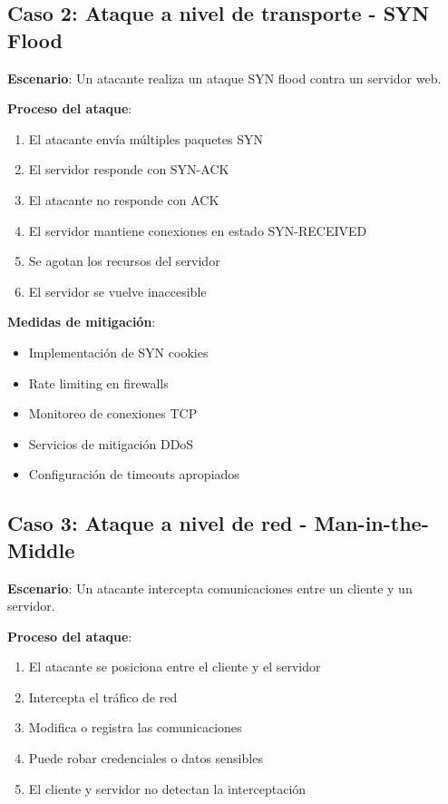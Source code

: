 \subsection{Caso 2: Ataque a nivel de transporte - SYN Flood}

\textbf{Escenario}: Un atacante realiza un ataque SYN flood contra un servidor web.

\textbf{Proceso del ataque}:
\begin{enumerate}
    \item El atacante envía múltiples paquetes SYN
    \item El servidor responde con SYN-ACK
    \item El atacante no responde con ACK
    \item El servidor mantiene conexiones en estado SYN-RECEIVED
    \item Se agotan los recursos del servidor
    \item El servidor se vuelve inaccesible
\end{enumerate}

\textbf{Medidas de mitigación}:
\begin{itemize}
    \item Implementación de SYN cookies
    \item Rate limiting en firewalls
    \item Monitoreo de conexiones TCP
    \item Servicios de mitigación DDoS
    \item Configuración de timeouts apropiados
\end{itemize}

\subsection{Caso 3: Ataque a nivel de red - Man-in-the-Middle}

\textbf{Escenario}: Un atacante intercepta comunicaciones entre un cliente y un servidor.

\textbf{Proceso del ataque}:
\begin{enumerate}
    \item El atacante se posiciona entre el cliente y el servidor
    \item Intercepta el tráfico de red
    \item Modifica o registra las comunicaciones
    \item Puede robar credenciales o datos sensibles
    \item El cliente y servidor no detectan la interceptación
\end{enumerate}

